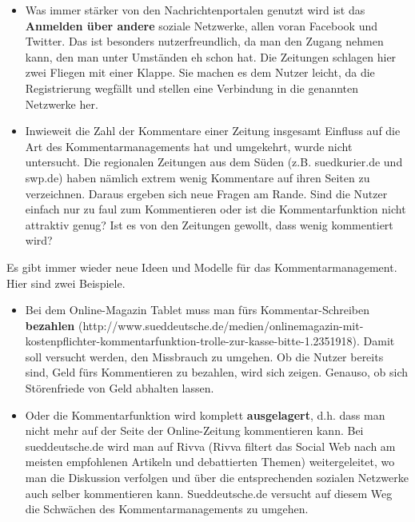 \begin{itemize}
\item Was immer stärker von den Nachrichtenportalen genutzt wird ist das
{\bfseries Anmelden über andere} soziale Netzwerke, allen voran Facebook und Twitter. Das ist besonders nutzerfreundlich, da man den Zugang nehmen kann, den man unter Umständen eh schon hat. Die Zeitungen schlagen hier zwei Fliegen mit einer Klappe. Sie machen es dem Nutzer leicht, da die Registrierung wegfällt und stellen eine Verbindung in die genannten Netzwerke her. 

\item Inwieweit die Zahl der Kommentare einer Zeitung insgesamt Einfluss auf die Art des Kommentarmanagements hat und umgekehrt, wurde nicht
untersucht. Die regionalen Zeitungen aus dem Süden (z.B. suedkurier.de und swp.de) haben nämlich extrem wenig Kommentare auf ihren Seiten zu verzeichnen. 
Daraus ergeben sich neue Fragen am Rande. Sind die Nutzer einfach nur zu faul zum Kommentieren oder
ist die Kommentarfunktion nicht attraktiv genug? Ist es von den Zeitungen gewollt, dass wenig kommentiert wird? 

\end{itemize}




Es gibt immer wieder neue Ideen und Modelle für das Kommentarmanagement. Hier sind zwei Beispiele.
\begin{itemize}
\item Bei dem Online-Magazin \glqq Tablet\grqq\- muss man fürs Kommentar-Schreiben {\bfseries bezahlen} (http://www.sueddeutsche.de/\-me\-dien/onlinemagazin-mit-kostenpflichter-kommentarfunktion-trolle-zur-kasse-bitte-1.2351918).
Damit soll versucht werden, den Missbrauch zu umgehen. Ob die Nutzer bereits sind, Geld fürs Kommentieren zu bezahlen, wird sich zeigen. Genauso, ob sich Störenfriede von Geld abhalten lassen.


\item Oder die Kommentarfunktion wird komplett {\bfseries ausgelagert}, d.h. dass man nicht mehr auf der Seite der Online-Zeitung kommentieren kann. Bei sueddeutsche.de wird man auf \glqq Rivva\grqq\- (Rivva filtert das Social Web nach am meisten empfohlenen Artikeln und debattierten Themen) weitergeleitet, wo man die Diskussion verfolgen und über die entsprechenden sozialen Netzwerke auch selber kommentieren kann. Sueddeutsche.de versucht auf diesem Weg die Schwächen des Kommentarmanagements zu umgehen. 

\end{itemize}